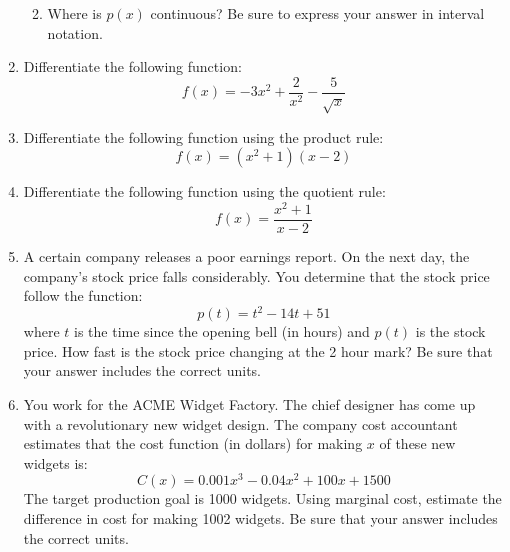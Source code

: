 \documentclass[letterpaper,12pt,fleqn]{article}
\begin{document}
\begin{enumerate}[left=0pt]
\begin{enumerate}
    \vspace{5in}
    
  \item Where is \(p(x)\) continuous?  Be sure to express your answer in interval notation.
  \end{enumerate}

  \newpage

\item Differentiate the following function:
  \[f(x)=-3x^2+\frac{2}{x^2}-\frac{5}{\sqrt{x}}\]

  \vspace{4in}

\item Differentiate the following function using the product rule:
  \[f(x)=(x^2+1)(x-2)\]

  \newpage

\item Differentiate the following function using the quotient rule:
  \[f(x)=\frac{x^2+1}{x-2}\]

  \vspace{4in}

\item A certain company releases a poor earnings report.  On the next day, the company's stock price falls considerably.
  You determine that the stock price follow the function:
  \[p(t)=t^2-14t+51\]
  where \(t\) is the time since the opening bell (in hours) and \(p(t)\) is the stock price.  How fast is the stock price
  changing at the 2 hour mark?  Be sure that your answer includes the correct units.

  \newpage

\item You work for the ACME Widget Factory.  The chief designer has come up with a revolutionary new widget design.  The
  company cost accountant estimates that the cost function (in dollars) for making \(x\) of these new widgets is:
  \[C(x)=0.001x^3-0.04x^2+100x+1500\]
  The target production goal is 1000 widgets.  Using marginal cost, estimate the difference in cost for making 1002 widgets.
  Be sure that your answer includes the correct units.  
\end{enumerate}
\end{document}
